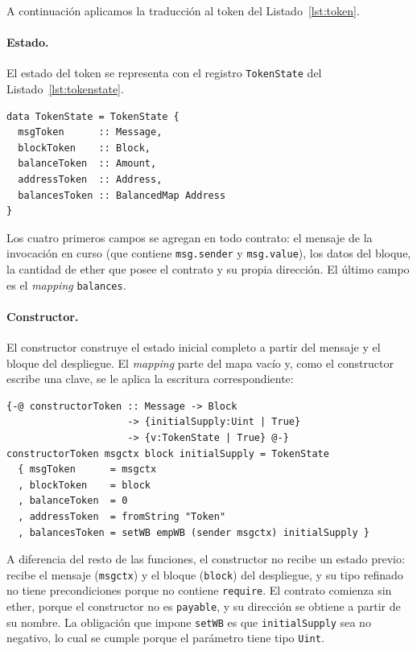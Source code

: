 A continuación aplicamos la traducción al token del Listado~\ref{lst:token}.

\paragraph{Estado.} El estado del token se representa con el registro
\lstinline|TokenState| del Listado~\ref{lst:tokenstate}.

\begin{lstlisting}[language=LHaskell, caption={Estado del token.}, label={lst:tokenstate}]
data TokenState = TokenState {
  msgToken      :: Message,
  blockToken    :: Block,
  balanceToken  :: Amount,
  addressToken  :: Address,
  balancesToken :: BalancedMap Address
}
\end{lstlisting}

Los cuatro primeros campos se agregan en todo contrato: el mensaje de la invocación
en curso (que contiene \lstinline|msg.sender| y \lstinline|msg.value|), los datos del
bloque, la cantidad de ether que posee el contrato y su propia dirección. El último
campo es el \emph{mapping} \lstinline|balances|.

\paragraph{Constructor.} El constructor construye el estado inicial completo a partir
del mensaje y el bloque del despliegue. El \emph{mapping} parte del mapa vacío y, como
el constructor escribe una clave, se le aplica la escritura correspondiente:

\begin{lstlisting}[language=LHaskell]
{-@ constructorToken :: Message -> Block
                     -> {initialSupply:Uint | True}
                     -> {v:TokenState | True} @-}
constructorToken msgctx block initialSupply = TokenState
  { msgToken      = msgctx
  , blockToken    = block
  , balanceToken  = 0
  , addressToken  = fromString "Token"
  , balancesToken = setWB empWB (sender msgctx) initialSupply }
\end{lstlisting}

\noindent A diferencia del resto de las funciones, el constructor no recibe un estado
previo: recibe el mensaje (\lstinline|msgctx|) y el bloque (\lstinline|block|) del
despliegue, y su tipo refinado no tiene precondiciones porque no contiene
\lstinline|require|. El contrato comienza sin ether, porque el constructor no es
\lstinline|payable|, y su dirección se obtiene a partir de su nombre. La obligación que
impone \lstinline|setWB| es que \lstinline|initialSupply| sea no negativo, lo cual se
cumple porque el parámetro tiene tipo \lstinline|Uint|.

